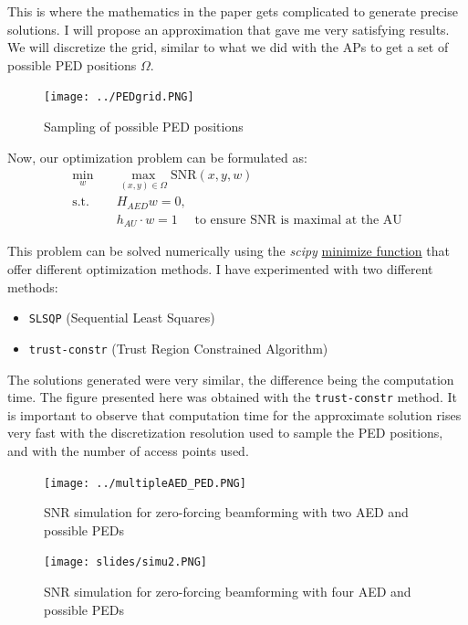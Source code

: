 \documentclass[a4paper,12pt,twoside]{article}
\begin{document}
	This is where the mathematics in the paper\cite{Oxford2021} gets complicated to generate precise solutions. I will propose an approximation that gave me very satisfying results. We will discretize the grid, similar to what we did with the APs to get a set of possible PED positions $\Omega$.
	
	\begin{figure}[h!]
		\centering
		\texttt{[image: ../PEDgrid.PNG]}
		\caption{Sampling of possible PED positions}
	\end{figure}
	
	Now, our optimization problem can be formulated as:
	\begin{align}
		\min_w \quad & \max_{(x,y) \in \Omega} \text{SNR}(x, y, w)  \\
		\text{s.t.} \quad & H_{AED} w = 0, \\
		& h_{AU} \cdot w = 1 \quad \text{ to ensure SNR is maximal at the AU}
	\end{align}
	
	This problem can be solved numerically using the \textit{scipy} \href{https://docs.scipy.org/doc/scipy/reference/generated/scipy.optimize.minimize.html}{minimize function} that offer different optimization methods. I have experimented with two different methods:
	\begin{itemize}
		\item \texttt{SLSQP} (Sequential Least Squares)
		\item \texttt{trust-constr} (Trust Region Constrained Algorithm)
	\end{itemize}
	The solutions generated were very similar, the difference being the computation time. The figure presented here was obtained with the \texttt{trust-constr} method. It is important to observe that computation time for the approximate solution rises very fast with the discretization resolution used to sample the PED positions, and with the number of access points used.
	
	\begin{figure}[h!]
		\centering
		\texttt{[image: ../multipleAED\_PED.PNG]}
		\caption{SNR simulation for zero-forcing beamforming with two AED and possible PEDs}
	\end{figure}
	
	
	\begin{figure}[h!]
		\centering
		\texttt{[image: slides/simu2.PNG]}
		\caption{SNR simulation for zero-forcing beamforming with four AED and possible PEDs}
	\end{figure}
\end{document}
